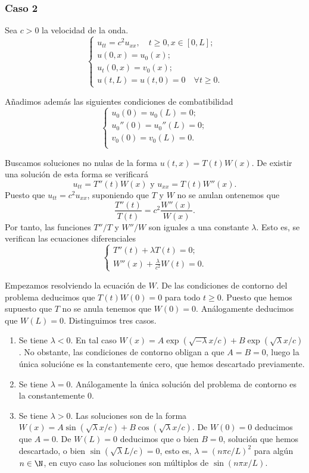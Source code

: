 \documentclass{article}
\begin{document}
\subsubsection{Caso 2}

Sea $c > 0$ la velocidad de la onda.
\begin{equation}
  \label{eq:ondas:2}
  \begin{cases}
    u_{tt} = c^2 u_{xx}, \quad t \ge 0, x \in [0,L]; \\
    u(0,x) = u_0(x); \\
    u_t(0,x) = v_0(x); \\
    u(t,L) = u(t,0) = 0 \quad \forall t \ge 0.
  \end{cases}
\end{equation}

Añadimos además las siguientes condiciones de combatibilidad
\[
  \begin{cases}
    u_0(0) = u_0(L) = 0; \\
    u_0''(0) = u_0''(L) = 0; \\
    v_0(0) = v_0(L) = 0. \\
  \end{cases}
\]

Buscamos soluciones no nulas de la forma $u(t,x) = T(t) W(x)$. De existir una solución de esta forma
se verificará
\[ u_{tt} = T''(t) W(x) \text{ y } u_{xx} = T(t) W''(x). \] Puesto que $u_{tt} = c^2 u_{xx}$,
suponiendo que $T$ y $W$ no se anulan ontenemos que
\[ \frac{T''(t)}{T(t)} = c^2 \frac{W''(x)}{W(x)}. \] Por tanto, las funciones $T''/T$ y $W''/W$ son
iguales a una constante $\lambda$. Esto es, se verifican las ecuaciones diferenciales
\[
  \begin{cases}
    T''(t) + \lambda T(t) = 0; \\
    W''(x) + \frac{\lambda}{c^2} W(t) = 0.
  \end{cases}
\]

Empezamos resolviendo la ecuación de $W$. De las condiciones de contorno del problema deducimos que
$T(t)W(0) = 0$ para todo $t \ge 0$. Puesto que hemos supuesto que $T$ no se anula tenemos que
$W(0) = 0$. Análogamente deducimos que $W(L) = 0$. Distinguimos tres casos.
\begin{enumerate}
\item Se tiene $\lambda < 0$. En tal caso
  $W(x) = A \exp(\sqrt{-\lambda} x / c) + B \exp(\sqrt{\lambda} x / c)$. No obstante, las
  condiciones de contorno obligan a que $A = B = 0$, luego la única solucióne es la constantemente
  cero, que hemos descartado previamente.
\item Se tiene $\lambda = 0$. Análogamente la única solución del problema de contorno es la
  constantemente $0$.
\item Se tiene $\lambda > 0$. Las soluciones son de la forma
  $W(x) = A \sin(\sqrt{\lambda} x / c) + B \cos(\sqrt{\lambda} x / c)$. De $W(0) = 0$ deducimos que
  $A = 0$. De $W(L) = 0$ deducimos que o bien $B = 0$, solución que hemos descartado, o bien
  $\sin(\sqrt{\lambda} L / c) = 0$, esto es, $\lambda = (n \pi c / L)^{2}$ para algún $n \in \N$, en
  cuyo caso las soluciones son múltiplos de $\sin(n \pi x / L)$.
\end{enumerate}
\end{document}
